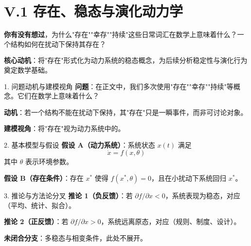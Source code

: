 \documentclass[../main.tex]{subfiles}
\begin{document}
\chapter{V.1 存在、稳态与演化动力学}
\label{math:existence}

\begin{motivation}
	\textbf{你有没有想过}，为什么"存在""幸存""持续"这些日常词汇在数学上意味着什么？一个结构如何在扰动下保持其存在？

	\textbf{核心动机}：将"存在"形式化为动力系统的稳态概念，为后续分析稳定性与演化行为奠定数学基础。
\end{motivation}

\begin{logicmap}
\end{logicmap}


\begin{mathbox}{1. 问题动机与建模视角}
	\textbf{问题}：在正文中，我们多次使用"存在""幸存""持续"等概念。它们在数学上意味着什么？
	
	\textbf{动机}：若一个结构不能在扰动下保持，其"存在"只是一瞬事件，而非可讨论对象。
	
	\textbf{建模视角}：将"存在"视为动力系统中的。
\end{mathbox}

\begin{mathbox}{2. 基本模型与假设}
	\textbf{假设 A（动力系统）}：系统状态 $x(t)$ 满足
	\[ \dot{x} = f(x, \theta) \]
	其中 $\theta$ 表示环境参数。
	
	\textbf{假设 B（存在条件）}：存在 $x^*$ 使得 $f(x^*,\theta)=0$，且在小扰动下系统回归 $x^*$。
\end{mathbox}

\begin{mathbox}{3. 推论与方法论分叉}
	\textbf{推论 1（负反馈）}：若 $\partial f/\partial x <0$，系统表现为稳态，对应（平均、统计、拟合）。
	
	\textbf{推论 2（正反馈）}：若 $\partial f/\partial x >0$，系统远离原态，对应（规则、制度、设计）。
	
	\textbf{未闭合分支}：多稳态与相变条件，此处不展开。
\end{mathbox}

\label{math:various}

\end{document}
